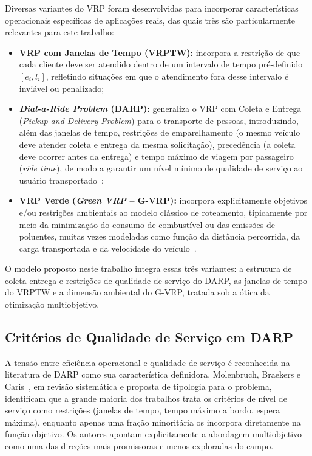 \documentclass[12pt,a4paper]{article}
\theoremstyle{plain}
\begin{document}
Diversas variantes do VRP foram desenvolvidas para incorporar características operacionais específicas de aplicações reais, das quais três são particularmente relevantes para este trabalho:

\begin{itemize}
    \item \textbf{VRP com Janelas de Tempo (VRPTW):} incorpora a restrição de que cada cliente deve ser atendido dentro de um intervalo de tempo pré-definido $[e_i, l_i]$, refletindo situações em que o atendimento fora desse intervalo é inviável ou penalizado;
    \item \textbf{\textit{Dial-a-Ride Problem} (DARP):} generaliza o VRP com Coleta e Entrega (\textit{Pickup and Delivery Problem}) para o transporte de pessoas, introduzindo, além das janelas de tempo, restrições de emparelhamento (o mesmo veículo deve atender coleta e entrega da mesma solicitação), precedência (a coleta deve ocorrer antes da entrega) e tempo máximo de viagem por passageiro (\textit{ride time}), de modo a garantir um nível mínimo de qualidade de serviço ao usuário transportado~\cite{cordeau2003,cordeau2006};
    \item \textbf{VRP Verde (\textit{Green VRP} -- G-VRP):} incorpora explicitamente objetivos e/ou restrições ambientais ao modelo clássico de roteamento, tipicamente por meio da minimização do consumo de combustível ou das emissões de poluentes, muitas vezes modeladas como função da distância percorrida, da carga transportada e da velocidade do veículo~\cite{lin2014}.
\end{itemize}

O modelo proposto neste trabalho integra essas três variantes: a estrutura de coleta-entrega e restrições de qualidade de serviço do DARP, as janelas de tempo do VRPTW e a dimensão ambiental do G-VRP, tratada sob a ótica da otimização multiobjetivo.

\subsection{Critérios de Qualidade de Serviço em DARP}

A tensão entre eficiência operacional e qualidade de serviço é reconhecida na literatura de DARP como sua característica definidora. Molenbruch, Braekers e Caris~\cite{molenbruch2017}, em revisão sistemática e proposta de tipologia para o problema, identificam que a grande maioria dos trabalhos trata os critérios de nível de serviço como restrições (janelas de tempo, tempo máximo a bordo, espera máxima), enquanto apenas uma fração minoritária os incorpora diretamente na função objetivo. Os autores apontam explicitamente a abordagem multiobjetivo como uma das direções mais promissoras e menos exploradas do campo.
\end{document}
